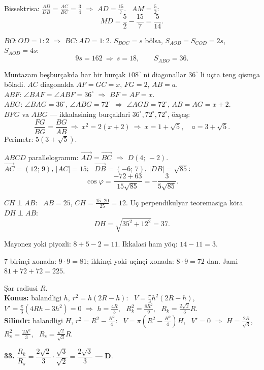 Bissektrisa: $\frac{AD}{DB}=\frac{AC}{BC}=\frac34$ $\Rightarrow$ $AD=\frac{15}7$. \ $AM=\frac52$:
\[MD=\frac52-\frac{15}7=\frac5{14}.\]

$BO:OD=1:2$ $\Rightarrow$ $BC:AD=1:2$. $S_{BOC}=s$ bölsa, $S_{AOB}=S_{COD}=2s$, $S_{AOD}=4s$:
\[9s=162\ \Rightarrow\ s=18,\qquad S_{ABO}=36.\]

Muntazam beşburçakda har bir burçak $108^\circ$ ni diagonallar $36^\circ$ li uçta teng qismga böladi. $AC$ diagonalda $AF=GC=x$, $FG=2$, $AB=a$.\\
$ABF$: $\angle BAF=\angle ABF=36^\circ$ $\Rightarrow$ $BF=AF=x$.\\
$ABG$: $\angle BAG=36^\circ$, $\angle ABG=72^\circ$ $\Rightarrow$ $\angle AGB=72^\circ$, $AB=AG=x+2$.\\
$BFG$ va $ABG$ — ikkalasining burçaklari $36^\circ,72^\circ,72^\circ$, öxşaş:
\[\frac{FG}{BG}=\frac{BG}{AB}\ \Rightarrow\ x^2=2(x+2)\ \Rightarrow\ x=1+\sqrt5,\quad a=3+\sqrt5.\]
Perimetr: $5\left(3+\sqrt5\right)$.

$ABCD$ parallelogramm: $\vec{AD}=\vec{BC}$ $\Rightarrow$ $D(4;\,-2)$.\\
$\vec{AC}=(12;\,9)$, $|AC|=15$; \ $\vec{DB}=(-6;\,7)$, $|DB|=\sqrt{85}$:
\[\cos\varphi=\frac{-72+63}{15\sqrt{85}}=-\frac3{5\sqrt{85}}.\]

$CH\perp AB$: \ $AB=25$, $CH=\frac{15\cdot20}{25}=12$. Uç perpendikulyar teoremasiga köra $DH\perp AB$:
\[DH=\sqrt{35^2+12^2}=37.\]

Mayonez yoki piyozli: $8+5-2=11$. Ikkalasi ham yöq: $14-11=3$.

$7$ birinçi xonada: $9\cdot9=81$; ikkinçi yoki uçinçi xonada: $8\cdot9=72$ dan. Jami $81+72+72=225$.

\newpage
{}
Şar radiusi $R$.\\
\textbf{Konus:} balandligi $h$, $r^2=h(2R-h)$: \ $V=\frac\pi3h^2(2R-h)$, \ $V'=\frac\pi3(4Rh-3h^2)=0$ $\Rightarrow$ $h=\frac{4R}3$, \ $R_k^2=\frac{8R^2}9$, \ $R_k=\frac{2\sqrt2}3R$.\\
\textbf{Silindr:} balandligi $H$, $r^2=R^2-\frac{H^2}4$: \ $V=\pi\left(R^2-\frac{H^2}4\right)H$, \ $V'=0$ $\Rightarrow$ $H=\frac{2R}{\sqrt3}$, \ $R_s^2=\frac{2R^2}3$, \ $R_s=\frac{\sqrt2}{\sqrt3}R$.

\textbf{33.} $\dfrac{R_k}{R_s}=\dfrac{2\sqrt2}3\cdot\dfrac{\sqrt3}{\sqrt2}=\dfrac{2\sqrt3}3$ — \textbf{D}.

